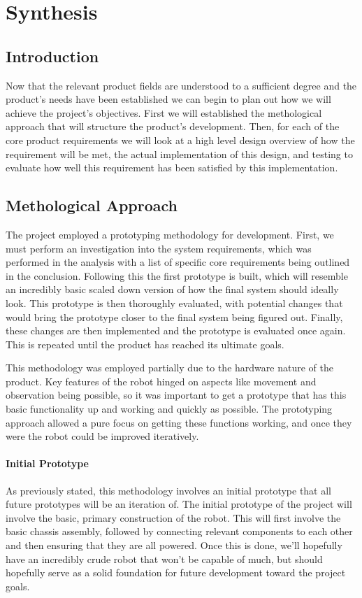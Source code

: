 \part{Synthesis}
	\chapter{Introduction}
	Now that the relevant product fields are understood to a sufficient degree and the product's needs have been established we can begin to plan out how we will achieve the project's objectives. First we will established the methological approach that will structure the product's development. Then, for each of the core product requirements we will look at a high level design overview of how the requirement will be met, the actual implementation of this design, and testing to evaluate how well this requirement has been satisfied by this implementation.
	
	\chapter{Methological Approach}
	The project employed a prototyping methodology for development. First, we must perform an investigation into the system requirements, which was performed in the analysis with a list of specific core requirements being outlined in the conclusion. Following this the first prototype is built, which will resemble an incredibly basic scaled down version of how the final system should ideally look. This prototype is then thoroughly evaluated, with potential changes that would bring the prototype closer to the final system being figured out. Finally, these changes are then implemented and the prototype is evaluated once again. This is repeated until the product has reached its ultimate goals.
	
	
	This methodology was employed partially due to the hardware nature of the product. Key features of the robot hinged on aspects like movement and observation being possible, so it was important to get a prototype that has this basic functionality up and working and quickly as possible. The prototyping approach allowed a pure focus on getting these functions working, and once they were the robot could be improved iteratively.
	
		\subsection{Initial Prototype}
		As previously stated, this methodology involves an initial prototype that all future prototypes will be an iteration of. The initial prototype of the project will involve the basic, primary construction of the robot. This will first involve the basic chassis assembly, followed by connecting relevant components to each other and then ensuring that they are all powered. Once this is done, we'll hopefully have an incredibly crude robot that won't be capable of much, but should hopefully serve as a solid foundation for future development toward the project goals.
		
